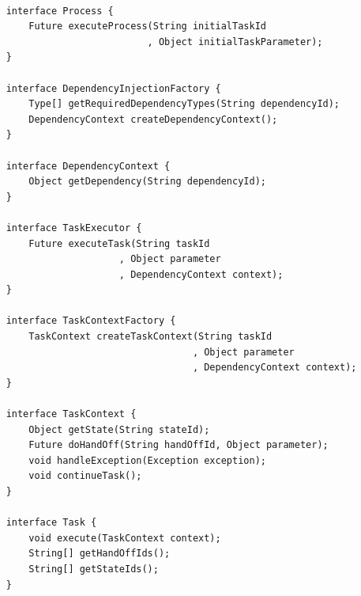 \documentclass[prodmode]{style/acmlarge}
\begin{document}
\begin{lstlisting}[float,label=lst:ContinuationInjectionInterfaces]

    interface Process {
        Future executeProcess(String initialTaskId
                             , Object initialTaskParameter);
    }

    interface DependencyInjectionFactory {
        Type[] getRequiredDependencyTypes(String dependencyId);
        DependencyContext createDependencyContext();
    }
    
    interface DependencyContext {
        Object getDependency(String dependencyId);
    }

    interface TaskExecutor {
        Future executeTask(String taskId 
                        , Object parameter
                        , DependencyContext context);
    }

    interface TaskContextFactory {
        TaskContext createTaskContext(String taskId
                                     , Object parameter
                                     , DependencyContext context);
    }

    interface TaskContext {
        Object getState(String stateId);
        Future doHandOff(String handOffId, Object parameter);
        void handleException(Exception exception);
        void continueTask();
    }

    interface Task {
        void execute(TaskContext context);
        String[] getHandOffIds();
        String[] getStateIds();
    }
\end{lstlisting}
\end{document}
